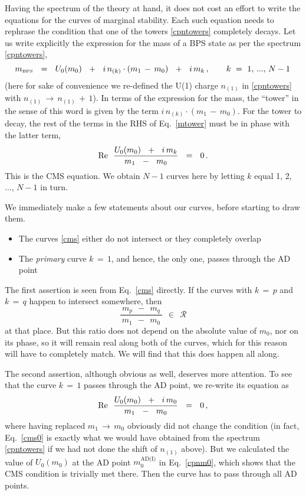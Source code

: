 \documentclass[epsfig,12pt]{article}
\def\beq{\begin{equation}}
\def\eeq{\end{equation}}
\def\beq{\begin{equation}}
\def\eeq{\end{equation}}
\newcommand{\mc}[1]{\mathcal{#1}}
\newcommand{\mbps}{m_{\text{\tiny BPS}}}
\begin{document}
	Having the spectrum of the theory at hand, it does not cost an effort to write the equations 
	for the curves of marginal stability.
	Each such equation needs to rephrase the condition that one of the towers \eqref{cpntowers}
	completely decays.
	Let us write explicitly the expression for the mass of a BPS state as per the spectrum \eqref{cpntowers},
\beq
\label{mtower}
	\mbps ~~=~~ U_0 (m_0) ~~+~~ i\, n_{(k)} \cdot ( m_1 \,-\, m_0 ) ~~+~~ i\, m_k\,,
	\qquad k ~=~ 1,\,...,\, N-1\,
\eeq
	(here for sake of convenience we re-defined the U(1) charge $ n_{(1)} $ 
	in \eqref{cpntowers} with $ n_{(1)} \,\to\, n_{(1)} \,+\, 1 $).
	In terms of the expression for the mass, the ``tower'' in the sense of this word 
	is given by the term $ i\, n_{(k)} \cdot ( m_1 \,-\, m_0 ) $.
	For the tower to decay, the rest of the terms in the RHS of Eq.~\eqref{mtower} must be
	in phase with the latter term,
\vspace{2mm}
\beq
\label{cms}
	\text{Re}~~ \frac{ U_0 (m_0) ~~+~~ i\, m_k }
                         { m_1 ~~-~~ m_0 }    ~~=~~ 0\,. \\[1.5mm]
\eeq
	This is the CMS equation.
	We obtain $ N - 1 $ curves here by letting $ k $ equal 1, 2, ..., $ N - 1 $
	in turn.

	We immediately make a few statements about our curves, before starting to draw them.
\begin{itemize}
\item
	The curves \eqref{cms} either do not intersect or they completely overlap

\item
	The {\it primary} curve $ k \,=\, 1 $, and hence, the only one, passes through the AD point
\end{itemize}
	The first assertion is seen from Eq.~\eqref{cms} directly.
	If the curves with $ k \,=\, p $ and $ k \,=\, q $ happen to intersect somewhere, then
\beq
\label{overlap}
	\frac{ \,m_p ~~-~~ m_q\, }
             { \,m_1 ~~-~~ m_0\, } ~~\in~~ \mc{R}
\eeq
	at that place.
	But this ratio does not depend on the absolute value of $ m_0 $, nor on its phase, so
	it will remain real along both of the curves, which for this reason will have to completely match.
	We will find that this does happen all along.

	The second assertion, although obvious as well, deserves more attention.
	To see that the curve $ k \,=\, 1 $ passes through the AD point, we re-write its equation as
\vspace{2mm}
\beq
\label{cms0}
	\text{Re}~~ \frac{ U_0 (m_0) ~~+~~ i\, m_0 }
                         { m_1 ~~-~~ m_0 }    ~~=~~ 0\,, \\[1.5mm]
\eeq
	where having replaced $ m_1 \,\to\, m_0 $ obviously did not change the condition
	(in fact, Eq.~\eqref{cms0} is exactly what we would have obtained from the spectrum \eqref{cpntowers}
	if we had not done the shift of $ n_{(1)} $ above).
	But we calculated the value of $ U_0(m_0) $ at the AD point $ m_0^\text{AD(I)} $ in Eq.~\eqref{cpnm0},
	which shows that the CMS condition is trivially met there.
	Then the curve has to pass through all AD points.
\end{document}
